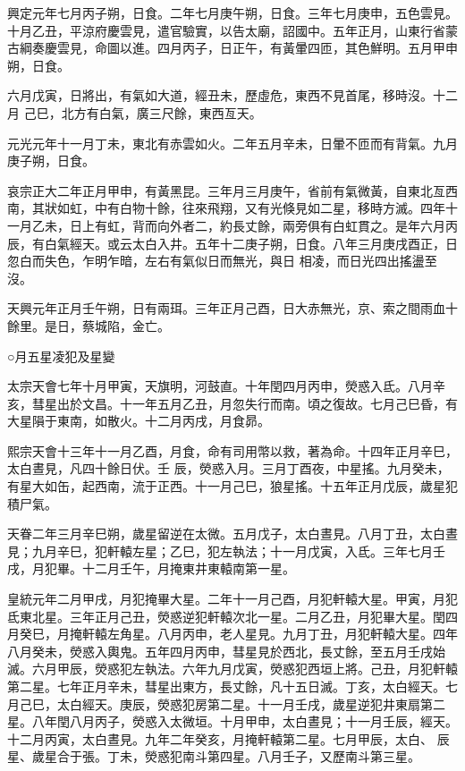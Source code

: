 \begin{pinyinscope}
 興定元年七月丙子朔，日食。二年七月庚午朔，日食。三年七月庚申，五色雲見。十月乙丑，平涼府慶雲見，遣官驗實，以告太廟，詔國中。五年正月，山東行省蒙古綱奏慶雲見，命圖以進。四月丙子，日正午，有黃暈四匝，其色鮮明。五月甲申朔，日食。



 六月戊寅，日將出，有氣如大道，經丑未，歷虛危，東西不見首尾，移時沒。十二月
 己巳，北方有白氣，廣三尺餘，東西亙天。



 元光元年十一月丁未，東北有赤雲如火。二年五月辛未，日暈不匝而有背氣。九月庚子朔，日食。



 哀宗正大二年正月甲申，有黃黑昆。三年月三月庚午，省前有氣微黃，自東北亙西南，其狀如虹，中有白物十餘，往來飛翔，又有光倏見如二星，移時方滅。四年十一月乙未，日上有虹，背而向外者二，約長丈餘，兩旁俱有白虹貫之。是年六月丙辰，有白氣經天。或云太白入井。五年十二庚子朔，日食。八年三月庚戌酉正，日忽白而失色，乍明乍暗，左右有氣似日而無光，與日
 相凌，而日光四出搖盪至沒。



 天興元年正月壬午朔，日有兩珥。三年正月己酉，日大赤無光，京、索之間雨血十餘里。是日，蔡城陷，金亡。



 ○月五星凌犯及星變



 太宗天會七年十月甲寅，天旗明，河鼓直。十年閏四月丙申，熒惑入氐。八月辛亥，彗星出於文昌。十一年五月乙丑，月忽失行而南。頃之復故。七月己巳昏，有大星隕于東南，如散火。十二月丙戌，月食昴。



 熙宗天會十三年十一月乙酉，月食，命有司用幣以救，著為命。十四年正月辛巳，太白晝見，凡四十餘日伏。壬
 辰，熒惑入月。三月丁酉夜，中星搖。九月癸未，有星大如缶，起西南，流于正西。十一月己巳，狼星搖。十五年正月戊辰，歲星犯積尸氣。



 天眷二年三月辛巳朔，歲星留逆在太微。五月戊子，太白晝見。八月丁丑，太白晝見；九月辛巳，犯軒轅左星；乙巳，犯左執法；十一月戊寅，入氐。三年七月壬戌，月犯畢。十二月壬午，月掩東井東轅南第一星。



 皇統元年二月甲戌，月犯掩畢大星。二年十一月己酉，月犯軒轅大星。甲寅，月犯氐東北星。三年正月己丑，熒惑逆犯軒轅次北一星。二月乙丑，月犯畢大星。閏四
 月癸巳，月掩軒轅左角星。八月丙申，老人星見。九月丁丑，月犯軒轅大星。四年八月癸未，熒惑入輿鬼。五年四月丙申，彗星見於西北，長丈餘，至五月壬戌始滅。六月甲辰，熒惑犯左執法。六年九月戊寅，熒惑犯西垣上將。己丑，月犯軒轅第二星。七年正月辛未，彗星出東方，長丈餘，凡十五日滅。丁亥，太白經天。七月己巳，太白經天。庚辰，熒惑犯房第二星。十一月壬戌，歲星逆犯井東扇第二星。八年閏八月丙子，熒惑入太微垣。十月甲申，太白晝見；十一月壬辰，經天。十二月丙寅，太白晝見。九年二年癸亥，月掩軒轅第二星。七月甲辰，太白、
 辰星、歲星合于張。丁未，熒惑犯南斗第四星。八月壬子，又歷南斗第三星。




\end{pinyinscope}
